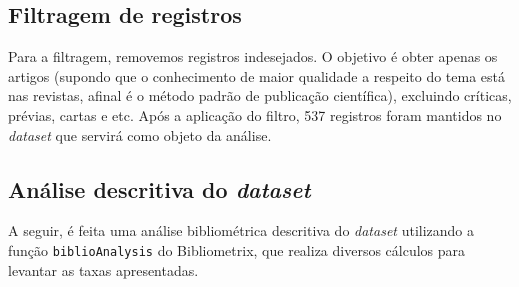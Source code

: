 \subsection{Filtragem de registros}

Para a filtragem, removemos registros indesejados. O objetivo é obter apenas os artigos (supondo que o conhecimento de maior qualidade a respeito do tema está nas revistas, afinal é o método padrão de publicação científica), excluindo críticas, prévias, cartas e etc. Após a aplicação do filtro, 537 registros foram mantidos no \textit{dataset} que servirá como objeto da análise.

\subsection{Análise descritiva do \textit{dataset} }

A seguir, é feita uma análise bibliométrica descritiva do \textit{dataset} utilizando a função \texttt{biblioAnalysis} do Bibliometrix, que realiza diversos cálculos para levantar as taxas apresentadas.

